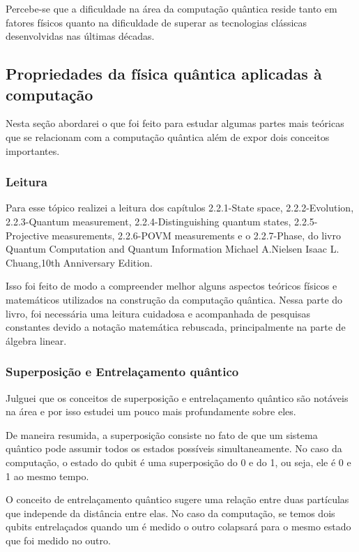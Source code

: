 \documentclass{article}
\begin{document}
        Percebe-se que a dificuldade na área da computação quântica reside tanto em fatores físicos quanto na dificuldade de superar as tecnologias clássicas desenvolvidas nas últimas décadas.  

    \subsection{Propriedades da física quântica aplicadas à computação}
        Nesta seção abordarei o que foi feito para estudar algumas partes mais teóricas que se relacionam com a computação quântica além de expor dois conceitos importantes.
        
        \subsubsection{Leitura}
        Para esse tópico realizei a leitura dos capítulos 2.2.1-State space, 2.2.2-Evolution, 2.2.3-Quantum measurement, 2.2.4-Distinguishing quantum states, 2.2.5-Projective measurements, 2.2.6-POVM measurements e o 2.2.7-Phase, do livro Quantum Computation and Quantum Information Michael A.Nielsen Isaac L. Chuang,10th Anniversary Edition. 
        
        Isso foi feito de modo a compreender melhor alguns aspectos teóricos físicos e matemáticos utilizados na construção da computação quântica. Nessa parte do livro, foi necessária uma leitura cuidadosa e acompanhada de pesquisas constantes devido a notação matemática rebuscada, principalmente na parte de álgebra linear.
        
        \subsubsection{Superposição e Entrelaçamento quântico}
        Julguei que os conceitos de superposição e entrelaçamento quântico são notáveis na área e por isso estudei um pouco mais profundamente sobre eles.
    
        De maneira resumida, a superposição consiste no fato de que um sistema quântico pode assumir todos os estados possíveis simultaneamente. No caso da computação, o estado do qubit é uma superposição do 0 e do 1, ou seja, ele é 0 e 1 ao mesmo tempo. 
    
        O conceito de entrelaçamento quântico sugere uma relação entre duas partículas que independe da distância entre elas. No caso da computação, se temos dois qubits entrelaçados quando um é medido o outro colapsará para o mesmo estado que foi medido no outro.
\end{document}
